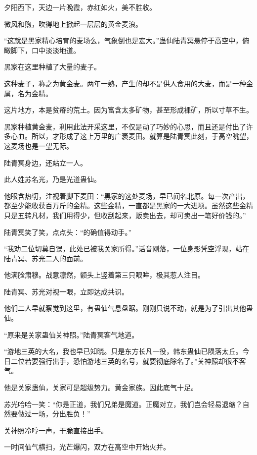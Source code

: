 
\begin{this_body}

夕阳西下，天边一片晚霞，赤红如火，美不胜收。

微风和煦，吹得地上掀起一层层的黄金麦浪。

“这就是黑家精心培育的麦场么，气象倒也是宏大。”蛊仙陆青冥悬停于高空中，俯瞰脚下，口中淡淡地道。

黑家在这里种植了大量的麦子。

这种麦子，称之为黄金麦。两年一熟，产生的却不是供人食用的大麦，而是一种金属，名为金精。

这片地方，本是贫瘠的荒土。因为富含太多矿物，甚至形成裸矿，所以寸草不生。

黑家种植黄金麦，利用此法开采这里，不仅是动了巧妙的心思，而且还是付出了许多心血。所以，才形成了这上万里的广袤麦田。就算是陆青冥此刻，于高空眺望，这麦场也是一望无际。

陆青冥身边，还站立一人。

此人姓苏名光，乃是光道蛊仙。

他眼含热切，注视着脚下麦田：“黑家的这处麦场，早已闻名北原。每一次产出，都至少能收获百万斤的金精。这些金精，一直都是黑家的一大进项。虽然这些金精只是五转凡材，我们用得少，但收刮起来，贩卖出去，却可卖出一笔好价钱的。”

陆青冥笑了笑，点点头：“的确值得动手。”

“我劝二位切莫自误，此处已被我关家所得。”话音刚落，一位身影凭空浮现，站在陆青冥、苏光二人的面前。

他满脸肃穆。战意凛然，额头上竖着第三只眼眸，极其惹人注目。

陆青冥、苏光对视一眼，立即达成共识。

他们二人早就察觉到这里，有蛊仙气息盘踞。刚刚只说不动，就是为了引出其他蛊仙。

“原来是关家蛊仙关神照。”陆青冥客气地道。

“游地三英的大名，我也早已知晓。只是东方长凡一役，韩东蛊仙已陨落太丘。今日二位若要强行出手，恐怕游地三英的名号，就要彻底除名了。”关神照却很不客气。

他是关家蛊仙，关家可是超级势力。黄金家族。因此底气十足。

苏光哈哈一笑：“你是正道，我们兄弟是魔道。正魔对立，我们岂会轻易退缩？自然要做过一场，分出胜负！”

关神照冷哼一声，干脆直接出手。

一时间仙气横扫，光芒爆闪，双方在高空中开始火并。


\end{this_body}
